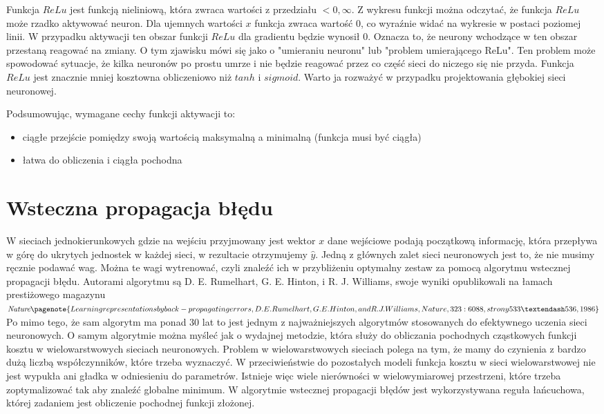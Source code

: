 Funkcja $ReLu$ jest funkcją nieliniową, która zwraca wartości z przedziału $<0, \infty$. Z wykresu funkcji można odczytać, że funkcja $ReLu$ może rzadko aktywować neuron. Dla ujemnych wartości $x$ funkcja zwraca wartość 0, co wyraźnie widać na wykresie w postaci poziomej linii. W przypadku aktywacji ten obszar funkcji $ReLu$ dla gradientu będzie wynosił 0. Oznacza to, że neurony wchodzące w ten obszar przestaną reagować na zmiany. O tym zjawisku mówi się jako o "umieraniu neuronu" lub "problem umierającego ReLu". Ten problem może spowodować sytuacje, że kilka neuronów po prostu umrze i nie będzie reagować przez co część sieci do niczego się nie przyda. Funkcja $ReLu$ jest znacznie mniej kosztowna obliczeniowo niż $tanh$ i $sigmoid$. Warto ja rozważyć w przypadku projektowania głębokiej sieci neuronowej. 

Podsumowując, wymagane cechy funkcji aktywacji to:
\begin{itemize}
	\item ciągłe przejście pomiędzy swoją wartością maksymalną a minimalną (funkcja musi być ciągła)
	\item łatwa do obliczenia i ciągła pochodna
\end{itemize} 


\section{Wsteczna propagacja błędu}

W sieciach jednokierunkowych gdzie na wejściu przyjmowany jest wektor $x$ dane wejściowe podają początkową informację, która przepływa w górę do ukrytych jednostek w każdej sieci, w rezultacie otrzymujemy $\hat{y}$. Jedną z głównych zalet sieci neuronowych jest to, że nie musimy ręcznie podawać wag. Można te wagi wytrenować, czyli znaleźć ich w przybliżeniu optymalny zestaw za pomocą algorytmu wstecznej propagacji błędu. Autorami algorytmu są D. E. Rumelhart, G. E. Hinton,
i R. J. Williams, swoje wyniki opublikowali na łamach prestiżowego magazynu $\textit{Nature} \pagenote{Learning representations by back-propagating errors, D. E. Rumelhart, G. E. Hinton,
	and R. J. Williams, Nature, 323: 6088, strony 533–536, 1986}$  Po mimo tego, że sam algorytm ma ponad 30 lat to jest jednym z najważniejszych algorytmów stosowanych do efektywnego uczenia sieci neuronowych. O samym algorytmie można myśleć jak o wydajnej metodzie, która służy do obliczania pochodnych cząstkowych funkcji kosztu w wielowarstwowych sieciach neuronowych. Problem w wielowarstwowych sieciach polega na tym, że mamy do czynienia z bardzo dużą liczbą współczynników, które trzeba wyznaczyć. W przeciwieństwie do pozostałych modeli funkcja kosztu w sieci wielowarstwowej nie jest wypukła ani gładka w odniesieniu do parametrów. Istnieje więc wiele nierówności w wielowymiarowej przestrzeni, które trzeba zoptymalizować tak aby znaleźć globalne minimum. W algorytmie wstecznej propagacji błędów jest wykorzystywana reguła łańcuchowa, której zadaniem jest obliczenie pochodnej funkcji złożonej.

